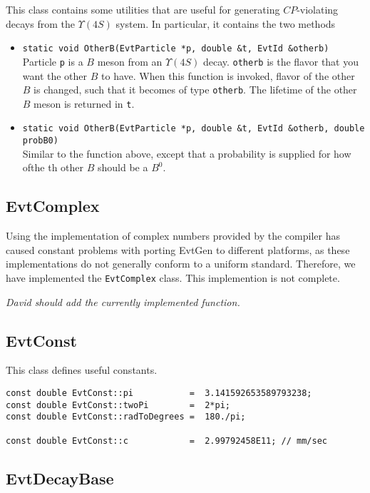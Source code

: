 This class contains some utilities that are useful for 
generating $CP$-violating decays from the $\Upsilon(4S)$ system.
In particular, it contains the two methods
\begin{itemize}
\item {\tt static void OtherB(EvtParticle *p, double \&t, EvtId \&otherb)}\\
      Particle {\tt p} is a $B$ meson from an $\Upsilon(4S)$ decay. 
      {\tt otherb} is the flavor that you want the other $B$ to have.
      When this function is invoked, flavor of the other $B$ is changed,
      such that it becomes of type {\tt otherb}. The lifetime of the
      other $B$ meson is returned in {\tt t}.
\item {\tt static void OtherB(EvtParticle *p, double \&t, EvtId \&otherb, double probB0)}\\
      Similar to the function above, except that a probability is supplied
      for how ofthe th other $B$ should be a $B^0$.
\end{itemize}


\subsection{EvtComplex}

Using the implementation of complex numbers provided by the compiler
has caused constant problems with porting EvtGen to different
platforms, as these implementations do not generally conform to
a uniform standard. Therefore, we have implemented the {\tt EvtComplex} 
class. This implemention is not complete.

{\it David should add the currently implemented function.}


\subsection{EvtConst}

This class defines useful constants. 
\begin{verbatim}
const double EvtConst::pi           =  3.141592653589793238;
const double EvtConst::twoPi        =  2*pi;
const double EvtConst::radToDegrees =  180./pi;
 
const double EvtConst::c            =  2.99792458E11; // mm/sec
\end{verbatim}


\subsection{EvtDecayBase}

